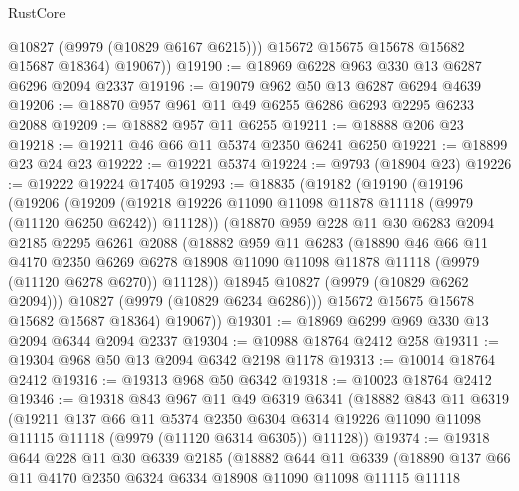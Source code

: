 \begin{lexlean}{RustCore}
\begin{coremodule}
            @10827
            (@9979 (@10829 @6167 @6215)))
          @15672
          @15675
          @15678
          @15682
          @15687
          @18364)
        @19067))
@19190 := @18969 @6228 @963 @330 @13 @6287 @6296 @2094 @2337
@19196 := @19079 @962 @50 @13 @6287 @6294 @4639
@19206 := @18870 @957 @961 @11 @49 @6255 @6286 @6293 @2295 @6233 @2088
@19209 := @18882 @957 @11 @6255
@19211 := @18888 @206 @23
@19218 := @19211 @46 @66 @11 @5374 @2350 @6241 @6250
@19221 := @18899 @23 @24 @23
@19222 := @19221 @5374
@19224 := @9793 (@18904 @23)
@19226 := @19222 @19224 @17405
@19293 := @18835
    (@19182
      (@19190
        (@19196
          (@19206
            (@19209 (@19218 @19226 @11090 @11098 @11878 @11118 (@9979 (@11120 @6250 @6242)) @11128))
            (@18870
              @959
              @228
              @11
              @30
              @6283
              @2094
              @2185
              @2295
              @6261
              @2088
              (@18882
                @959
                @11
                @6283
                (@18890
                  @46
                  @66
                  @11
                  @4170
                  @2350
                  @6269
                  @6278
                  @18908
                  @11090
                  @11098
                  @11878
                  @11118
                  (@9979 (@11120 @6278 @6270))
                  @11128))
              @18945
              @10827
              (@9979 (@10829 @6262 @2094)))
            @10827
            (@9979 (@10829 @6234 @6286)))
          @15672
          @15675
          @15678
          @15682
          @15687
          @18364)
        @19067))
@19301 := @18969 @6299 @969 @330 @13 @2094 @6344 @2094 @2337
@19304 := @10988 @18764 @2412 @258
@19311 := @19304 @968 @50 @13 @2094 @6342 @2198 @1178
@19313 := @10014 @18764 @2412
@19316 := @19313 @968 @50 @6342
@19318 := @10023 @18764 @2412
@19346 := @19318
    @843
    @967
    @11
    @49
    @6319
    @6341
    (@18882
      @843
      @11
      @6319
      (@19211
        @137
        @66
        @11
        @5374
        @2350
        @6304
        @6314
        @19226
        @11090
        @11098
        @11115
        @11118
        (@9979 (@11120 @6314 @6305))
        @11128))
@19374 := @19318
    @644
    @228
    @11
    @30
    @6339
    @2185
    (@18882
      @644
      @11
      @6339
      (@18890
        @137
        @66
        @11
        @4170
        @2350
        @6324
        @6334
        @18908
        @11090
        @11098
        @11115
        @11118

\end{coremodule}
\end{lexlean}
